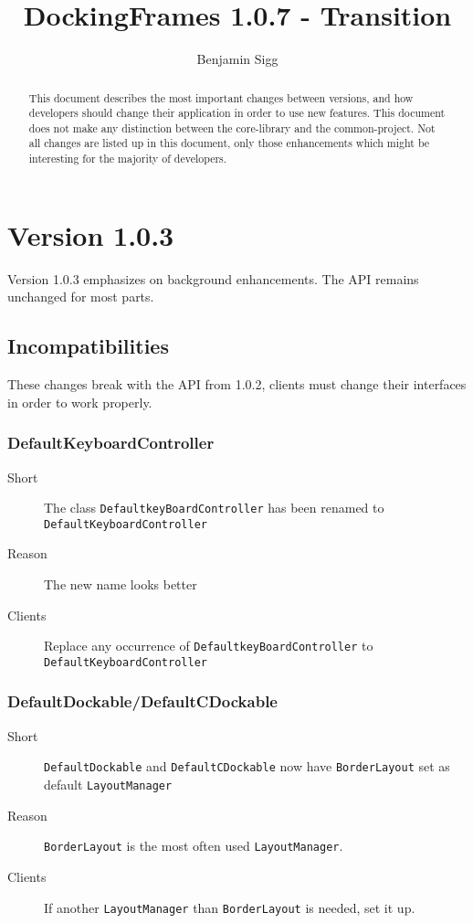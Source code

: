 \documentclass[a4paper,10pt]{article}
\title{DockingFrames 1.0.7 - Transition}
\author{Benjamin Sigg}
\newcommand{\src}[1]{\lstinline[basicstyle=\normalsize\ttfamily,keywordstyle=\normalsize\ttfamily,identifierstyle=\normalsize\ttfamily]|#1|}
\newcommand{\short}{\item[Short]}
\newcommand{\why}{\item[Reason]}
\newcommand{\clients}{\item[Clients]}
\begin{document}
\maketitle
\tableofcontents
\newpage


\begin{abstract}
This document describes the most important changes between versions, and how developers should change their application in order to use new features. This document does not make any distinction between the core-library and the common-project. Not all changes are listed up in this document, only those enhancements which might be interesting for the majority of developers.
\end{abstract}

\section{Version 1.0.3}
Version 1.0.3 emphasizes on background enhancements. The API remains unchanged for most parts.
\subsection{Incompatibilities}
These changes break with the API from 1.0.2, clients must change their interfaces in order to work properly.

\subsubsection{DefaultKeyboardController}
\begin{description}
\short The class \src{DefaultkeyBoardController} has been renamed to \\\src{DefaultKeyboardController} 
\why The new name looks better
\clients Replace any occurrence of \src{DefaultkeyBoardController} to \\\src{DefaultKeyboardController}
\end{description}

\subsubsection{DefaultDockable/DefaultCDockable}
\begin{description}
 \short \src{DefaultDockable} and \src{DefaultCDockable} now have \src{BorderLayout} set as default \src{LayoutManager}
 \why \src{BorderLayout} is the most often used \src{LayoutManager}.
 \clients If another \src{LayoutManager} than \src{BorderLayout} is needed, set it up.
\end{description}
\end{document}
